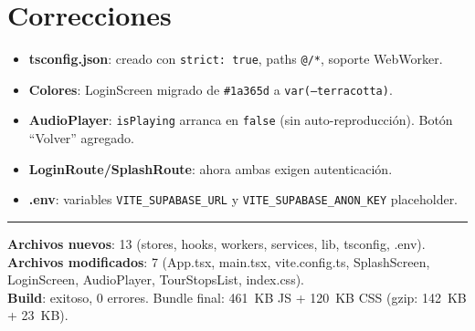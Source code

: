 \documentclass[11pt,a4paper]{article}
\begin{document}
\section{Correcciones}
\begin{itemize}[nosep]
  \item \textbf{tsconfig.json}: creado con \texttt{strict: true}, paths \texttt{@/*}, soporte WebWorker.
  \item \textbf{Colores}: LoginScreen migrado de \texttt{\#1a365d} a \texttt{var(--terracotta)}.
  \item \textbf{AudioPlayer}: \texttt{isPlaying} arranca en \texttt{false} (sin auto-reproducción). Botón ``Volver'' agregado.
  \item \textbf{LoginRoute/SplashRoute}: ahora ambas exigen autenticación.
  \item \textbf{.env}: variables \texttt{VITE\_SUPABASE\_URL} y \texttt{VITE\_SUPABASE\_ANON\_KEY} placeholder.
\end{itemize}

\vfill
\hrule
\small \textbf{Archivos nuevos}: 13 (stores, hooks, workers, services, lib, tsconfig, .env). \\
\textbf{Archivos modificados}: 7 (App.tsx, main.tsx, vite.config.ts, SplashScreen, LoginScreen, AudioPlayer, TourStopsList, index.css). \\
\textbf{Build}: exitoso, 0 errores. Bundle final: 461~KB JS + 120~KB CSS (gzip: 142~KB + 23~KB).
\end{document}
